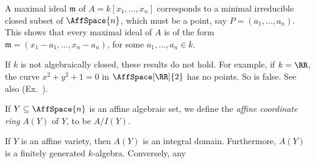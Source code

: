 { A maximal ideal $\mathfrak m$ of $A=k[x_1,\ldots,x_n]$ corresponds to a minimal irreducible closed subset of $\AffSpace{n}$, which must be a point, say $P=(a_1,\ldots,a_n)$. This shows that every maximal ideal of $A$ is of the form $\mathfrak m=(x_1-a_1,\ldots,x_n-a_n)$, for some $a_1,\ldots,a_n\in k$.

 If $k$ is not algebraically closed, these results do not hold. For example, if $k=\RR$, the curve $x^2+y^2+1=0$ in $\AffSpace[\RR]{2}$ has no points. So  is false. See also (Ex.~).

\Dfn If $Y\subseteq\AffSpace{n}$ is an affine algebraic set, we define the \emph{affine coordinate ring} $A(Y)$ of $Y$, to be $A/I(Y)$.

 If $Y$ is an affine variety, then $A(Y)$ is an integral domain. Furthermore, $A(Y)$ is a finitely generated $k$-algebra. Conversely, any
}

